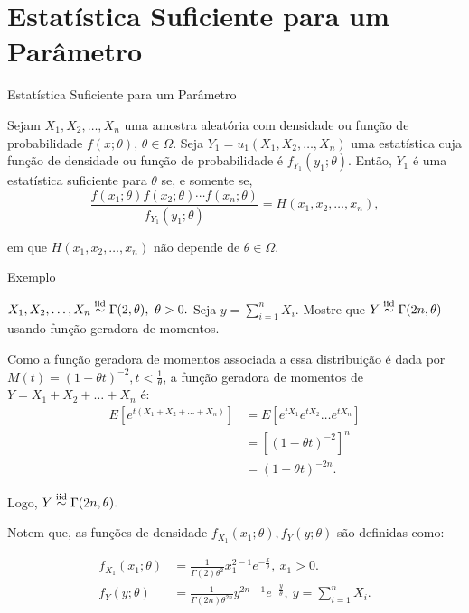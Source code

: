\documentclass[12pt]{beamer}
\begin{document}
\section{Estatística Suficiente para um Parâmetro}
\begin{frame}{Estatística Suficiente para um Parâmetro}
\begin{definicao}\label{def1}
\justifying
    Sejam $X_{1},X_{2}, \ldots , X_{n}$ uma amostra aleatória com densidade ou função de probabilidade $f(x; \theta)$, $\theta \in \Omega$. Seja $Y_{1} = u_{1}(X_{1},X_{2}, \ldots , X_{n})$ uma estatística cuja função de densidade ou função de probabilidade é $f_{Y_1}(y_1; \theta)$. Então, $Y_1$ é uma estatística suficiente para $\theta$ se, e somente se,
\begin{equation}
\dfrac{{f(x_1; \theta)f(x_2; \theta) \cdots f(x_n; \theta)}}{{f_{Y_1}(y_{1}; \theta)}} = H(x_1, x_2, \ldots , x_n),
\end{equation}

em que $H(x_1, x_2, \ldots , x_n)$ não depende de $\theta \in \Omega$.
\end{definicao}
\end{frame}

\begin{frame}{Exemplo}
\begin{block}{}
\justifying
$X_1,X_2, \ldots,X_n\overset{\text{iid}}{\sim} \Gamma(2,\theta),~\theta>0.$ Seja $y={\displaystyle \sum_{i=1}^{n}X_{i}}.$ Mostre que $Y\overset{\text{iid}}{\sim} \Gamma(2n,\theta)$ usando função geradora de momentos.
\end{block}
\pause
\begin{block}{}
\justifying
Como a função geradora de momentos associada a essa distribuição é dada por $M(t) = (1 - \theta t)^{-2}, t < \frac{1}{\theta}$, a função geradora de momentos de $Y= X_1 + X_2 + \ldots + X_n$ é:
\begin{align*}
E[e^{t(X_1+X_2+\ldots+X_n)}] &= E[e^{tX_1}e^{tX_2} \ldots e^{tX_n}] \\
&= [(1-\theta t)^{-2}]^n \\
&= (1 - \theta t)^{-2n}.
\end{align*}

Logo, $Y\overset{\text{iid}}{\sim} \Gamma(2n,\theta).$ 
\end{block}
\end{frame}

\begin{frame}{}
\begin{block}{}
\justifying
Notem que, as funções de densidade $f_{X_{1}}(x_{1};\theta), f_{Y}(y;\theta)$ são definidas como:

\begin{align*}
f_{X_{1}}(x_{1};\theta) &= 
\frac{1}{\Gamma(2)\theta^{2}}x_1^{2-1}e^{-\frac{x}{\theta}},~x_{1}>0.\\
f_{Y}(y;\theta) &= 
\frac{1}{\Gamma(2n)\theta^{2n}}y^{2n-1}e^{-\frac{y}{\theta}}, ~y={\displaystyle \sum_{i=1}^{n}X_{i}}.
\end{align*}
\end{block}
\end{frame}
\end{document}
